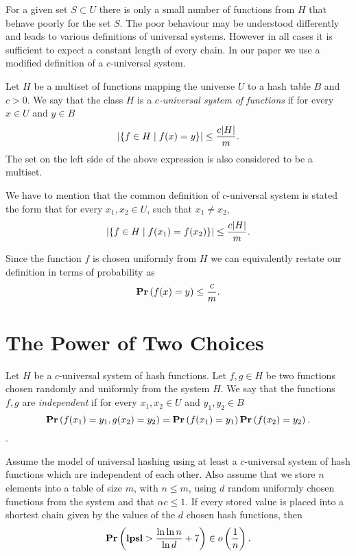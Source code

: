 For a given set $S \subset U$ there is only a small number of functions from $H$ that behave poorly for the set $S$. The poor behaviour may be understood differently and leads to various definitions of universal systems. However in all cases it is sufficient to expect a constant length of every chain. In our paper we use a modified definition of a $c$-universal system.

\begin{definition}
\label{definition-c-universal-system}
Let $H$ be a multiset of functions mapping the universe $U$ to a hash table $B$ and $c > 0$. We say that the class $H$ is a \emph{$c$-universal system of functions} if for every $x \in U$ and $y \in B$ 
\[
\left|\lbrace f \in H \mid f(x) = y \rbrace\right| \leq \frac{c |H|}{m} \textit{.}
\]
The set on the left side of the above expression is also considered to be a multiset.
\end{definition}

We have to mention that the common definition of $c$-universal system is stated the form that for every $x_1, x_2 \in U$, such that $x_1 \neq x_2$,
\[
\left|\lbrace f \in H \mid f(x_1) = f(x_2) \rbrace\right| \leq \frac{c |H|}{m} \textit{.}
\]

Since the function $f$ is chosen uniformly from $H$ we can equivalently restate our definition in terms of probability as
\[
\mathbf{Pr}\left(f(x) = y\right) \leq \frac{c}{m}.
\]

\section{The Power of Two Choices}
\begin{definition}
\label{definition-independent-hash-functions}
Let $H$ be a $c$-universal system of hash functions. Let $f, g \in H$ be two functions chosen randomly and uniformly from the system $H$. We say that the functions $f, g$ are \emph{independent} if for every $x_1, x_2 \in U$ and $y_1, y_2 \in B$ $$\mathbf{Pr}\left(f(x_1) = y_1, g(x_2\right) = y_2) = \mathbf{Pr}\left(f(x_1) = y_1\right) \mathbf{Pr}\left(f(x_2) = y_2\right) \textit{.}$$.
\end{definition}


\begin{theorem}
\label{theorem-universal-hashing-two-choices}
Assume the model of universal hashing using at least a $c$-universal system of hash functions which are independent of each other. Also assume that we store $n$ elements into a table of size $m$, with $n \leq m$, using $d$ random uniformly chosen functions from the system and that $\alpha c \leq 1$. If every stored value is placed into a shortest chain given by the values of the $d$ chosen hash functions, then $$\mathbf{Pr}\left(\mathbf{lpsl} > \frac{\ln \ln n}{\ln d} + 7\right) \in o\left(\frac{1}{n}\right) \textit{.}$$
\end{theorem}

